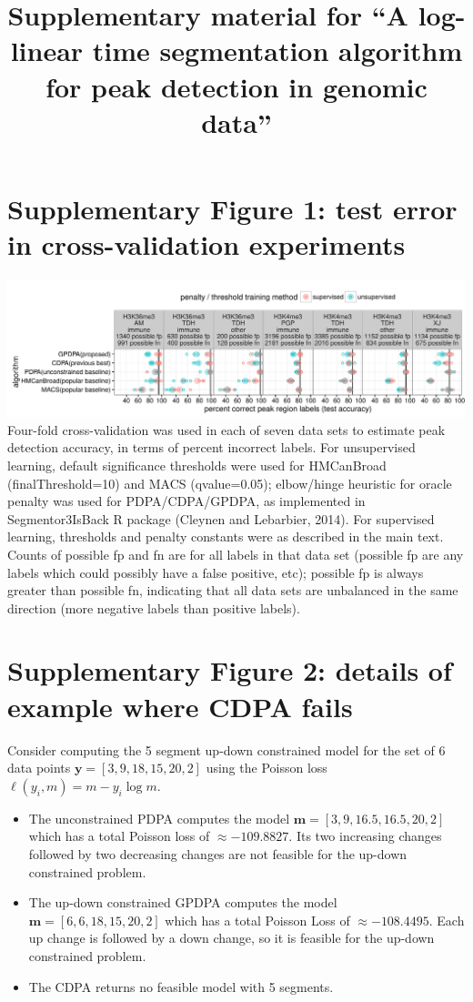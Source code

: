\documentclass{article}
\title{Supplementary material for ``A log-linear time segmentation algorithm for peak detection in genomic data''}
\begin{document}
\maketitle

\section*{Supplementary Figure 1: test error in cross-validation experiments}
\includegraphics[width=\textwidth]{figure-test-error-dots-supp}
Four-fold cross-validation was used in each of seven data sets to
estimate peak detection accuracy, in terms of percent incorrect
labels. For unsupervised learning, default significance thresholds
were used for HMCanBroad (finalThreshold=10) and MACS (qvalue=0.05);
elbow/hinge heuristic for oracle penalty was used for PDPA/CDPA/GPDPA,
as implemented in Segmentor3IsBack R package (Cleynen and Lebarbier,
2014). For supervised learning, thresholds and penalty constants were
as described in the main text. Counts of possible fp and fn are for
all labels in that data set (possible fp are any labels which could
possibly have a false positive, etc); possible fp is always greater
than possible fn, indicating that all data sets are unbalanced in the
same direction (more negative labels than positive labels).

\newpage
\section*{Supplementary Figure 2: details of example where CDPA fails}

Consider computing the 5 segment up-down constrained model for the set
of 6 data points $\mathbf y = [3, 9, 18, 15, 20, 2]$ using the Poisson loss
$\ell(y_i, m)=m-y_i\log m$. 
\begin{itemize}
\item The unconstrained PDPA computes the model $\mathbf m = [3, 9, 16.5, 16.5, 20,
  2]$ which has a total Poisson loss of $\approx -109.8827$. Its two increasing
  changes followed by two decreasing changes are not feasible for the
  up-down constrained problem.
\item The up-down constrained GPDPA computes the model $\mathbf m = [6, 6, 18, 15,
  20, 2]$ which has a total Poisson Loss of $\approx -108.4495$. Each
  up change is followed by a down change, so it is feasible for the
  up-down constrained problem.
\item The CDPA returns no feasible model with 5 segments.
\end{itemize}
\end{document}
